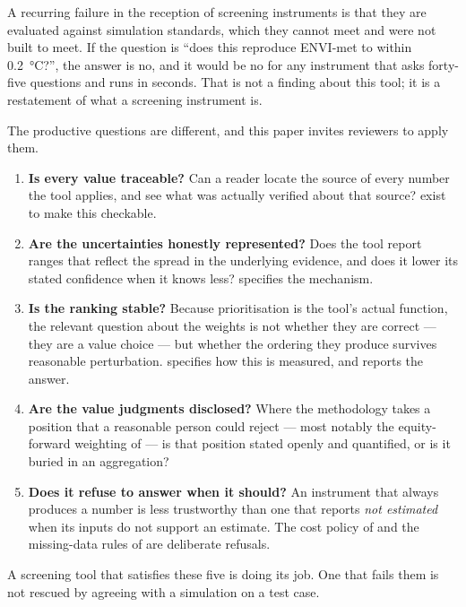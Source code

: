 A recurring failure in the reception of screening instruments is that they are
evaluated against simulation standards, which they cannot meet and were not
built to meet. If the question is ``does this reproduce ENVI-met to within
\qty{0.2}{\degreeCelsius}?'', the answer is no, and it would be no for any
instrument that asks forty-five questions and runs in seconds. That is not a
finding about this tool; it is a restatement of what a screening instrument is.

The productive questions are different, and this paper invites reviewers to
apply them.

\begin{enumerate}
  \item \textbf{Is every value traceable?} Can a reader locate the source of
  every number the tool applies, and see what was actually verified about that
  source?  exist to make this checkable.

  \item \textbf{Are the uncertainties honestly represented?} Does the tool
  report ranges that reflect the spread in the underlying evidence, and does it
  lower its stated confidence when it knows less? 
  specifies the mechanism.

  \item \textbf{Is the ranking stable?} Because prioritisation is the tool's
  actual function, the relevant question about the weights is not whether they
  are correct --- they are a value choice --- but whether the ordering they
  produce survives reasonable perturbation.  specifies
  how this is measured, and  reports the answer.

  \item \textbf{Are the value judgments disclosed?} Where the methodology takes
  a position that a reasonable person could reject --- most notably the
  equity-forward weighting of  --- is that position
  stated openly and quantified, or is it buried in an aggregation?

  \item \textbf{Does it refuse to answer when it should?} An instrument that
  always produces a number is less trustworthy than one that reports
  \emph{not estimated} when its inputs do not support an estimate. The cost
  policy of  and the missing-data rules of
   are deliberate refusals.
\end{enumerate}

A screening tool that satisfies these five is doing its job. One that fails
them is not rescued by agreeing with a simulation on a test case.
